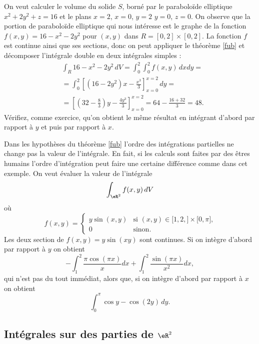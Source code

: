 \begin{example} 
On veut calculer le volume du solide $S$, borné par le paraboloïde elliptique $x^2+2y^2+z=16$ et le plans $x=2$, $x=0$, $y=2$ $y=0$, $z=0$. On observe que la portion de  paraboloïde elliptique qui nous intéresse est le graphe de la fonction $f(x,y)=16-x^2-2y^2$ pour $(x,y)$ dans $R=[0,2]\times[0,2]$. La fonction $f$ est continue ainsi que ses sections, donc on peut appliquer le théorème \ref{fub} et décomposer l'intégrale double en deux intégrales simples :
\begin{equation}
  \begin{aligned}
   & \int_R 16-x^2-2y^2 \,dV= \int_{0}^2\int_{0}^2f(x,y)\,dx dy= \\
&=\int_0^2 \left[(16-2y^2)x-\frac{x^3}{3}\right]_{x=0}^{x=2}\, dy =\\
& = \left[ \left(32-\frac{8}{3}\right) y -\frac{4y^3}{3}\right]_{x=0}^{x=2}= 64- \frac{16+32}{3}=48.
  \end{aligned}
\end{equation}
Vérifiez, comme exercice, qu'on obtient le même résultat en intégrant d'abord par rapport à $y$ et puis par rapport à $x$.  
\end{example}

\begin{example}
  Dans les hypothèses du théorème \ref{fub}  l'ordre des intégrations partielles ne change pas la valeur de l'intégrale. En fait, si les calculs sont faites par des êtres humains l'ordre d'intégration peut faire une certaine différence comme dans cet exemple. On veut évaluer la valeur de l'intégrale 
\[
\int_{\eR^2}f(x,y)\, dV
\]
où 
\begin{equation}
	f(x,y)=\begin{cases}
		y\sin(x,y)	&	\text{si $(x,y)\in\mathopen[ 1,2 ,  \mathclose]\times\mathopen[ 0 , \pi \mathclose]$,}\\
		0	&	 \text{sinon.}
	\end{cases}
\end{equation}
Les deux section de $f(x,y)=y\sin(xy)$ sont continues. Si on intègre d'abord par rapport à $y$ on obtient 
\[
-\int_1^2\frac{ \pi\cos(\pi x) }{ x }dx+\int_1^2\frac{ \sin(\pi x) }{ x^2 }dx,
\] 
qui n'est pas du tout immédiat, alors que, si on intègre d'abord par rapport à $x$ on obtient 
\[
\int_0^\pi \cos y - \cos(2y)\,dy.
\] 
\end{example}

\subsection{Intégrales sur des parties de $\eR^2$ }

